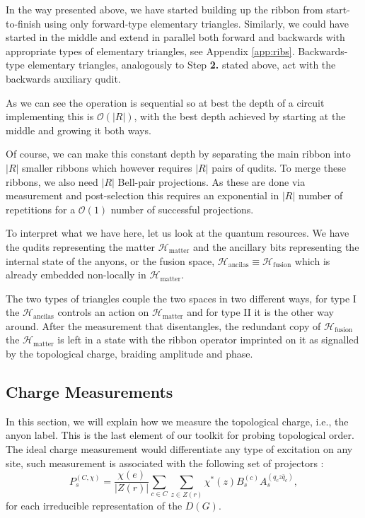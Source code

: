 \documentclass[two column]{article}
\begin{document}
In the way presented above, we have started building up the ribbon from start-to-finish using only forward-type elementary triangles. Similarly, we could have started in the middle and extend in parallel both forward and backwards with appropriate types of elementary triangles, see Appendix \ref{app:ribs}. Backwards-type elementary triangles, analogously to Step \textbf{2.} stated above, act with the backwards auxiliary qudit.

As we can see the operation is sequential so at best the depth of a circuit implementing this is $\mathcal{O}(|R|)$, with the best depth achieved by starting at the middle and growing it both ways.

Of course, we can make this constant depth by separating the main ribbon into $|R|$ smaller ribbons which however requires $|R|$ pairs of qudits. To merge these ribbons, we also need $|R|$ Bell-pair projections. As these are done via measurement and post-selection this requires an exponential in $|R|$ number of repetitions for a $\mathcal{O}(1)$ number of successful projections.

To interpret what we have here, let us look at the quantum resources. We have the qudits representing the matter $\mathcal{H}_{\text{matter}}$ and the ancillary bits representing the internal state of the anyons, or the fusion space, $\mathcal{H}_{\text{ancilas}} \equiv \mathcal{H}_{\text{fusion}}$ which is already embedded non-locally in  $\mathcal{H}_{\text{matter}}$.

The two types of triangles couple the two spaces in two different ways, for type I the $\mathcal{H}_{\text{ancilas}}$ controls an action on $\mathcal{H}_{\text{matter}}$ and for type II it is the other way around. After the measurement that disentangles, the redundant copy of $\mathcal{H}_{\text{fusion}}$ the $\mathcal{H}_{\text{matter}}$ is left in a state with the ribbon operator imprinted on it as signalled by the topological charge, braiding amplitude and phase.


\subsection{Charge Measurements}\label{sec:redchmmt}

In this section, we will explain how we measure the topological charge, i.e., the anyon label. This is the last element of our toolkit for probing topological order. The ideal charge measurement would differentiate any type of excitation on any site, such measurement is associated with the following set of projectors \cite{}:
\begin{equation}
    P_s^{(C, \chi)} = \frac{\chi(e)}{|Z(r)|}\sum_{c \in C}\sum_{z \in Z(r)}\chi^*(z)B_s^{(c)}A_s^{(q_c z \bar{q}_c)},
\end{equation}
for each irreducible representation of the $D(G)$.
\end{document}
